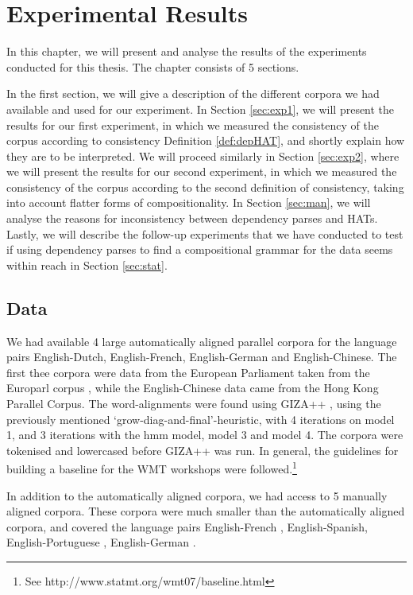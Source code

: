 %
%
%

\chapter{Experimental Results}

In this chapter, we will present and analyse the results of the experiments conducted for this thesis. The chapter consists of 5 sections.

In the first section, we will give a description of the different corpora we had available and used for our experiment. In Section \ref{sec:exp1}, we will present the results for our first experiment, in which we measured the consistency of the corpus according to consistency Definition \ref{def:depHAT}, and shortly explain how they are to be interpreted. We will proceed similarly in Section \ref{sec:exp2}, where we will present the results for our second experiment, in which we measured the consistency of the corpus according to the second definition of consistency, taking into account flatter forms of compositionality. In Section \ref{sec:man}, we will analyse the reasons for inconsistency between dependency parses and HATs. Lastly, we will describe the follow-up experiments that we have conducted to test if using dependency parses to find a compositional grammar for the data seems within reach in Section \ref{sec:stat}.


\section{Data}
\label{sec:data}

We had available 4 large automatically aligned parallel corpora for the language pairs English-Dutch, English-French, English-German and English-Chinese. The first thee corpora were data from the European Parliament taken from the Europarl corpus \citep{koehn2005europarl}, while the English-Chinese data came from the Hong Kong Parallel Corpus. The word-alignments were found using GIZA++ \citep{och03:asc}, using the previously mentioned `grow-diag-and-final'-heuristic, with 4 iterations on model 1, and 3 iterations with the hmm model, model 3 and model 4. The corpora were tokenised and lowercased before GIZA++ was run. In general, the guidelines for building a baseline for the WMT workshops were followed.\footnote{See http://www.statmt.org/wmt07/baseline.html}

In addition to the automatically aligned corpora, we had access to 5 manually aligned corpora. These corpora were much smaller than the automatically aligned corpora, and covered the language pairs English-French \citep{graca2008building,och2000improved}, English-Spanish, English-Portuguese \citep{graca2008building}, English-German \citep{pado2006optimal}.

